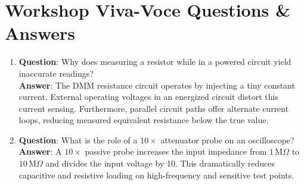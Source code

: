 \section{Workshop Viva-Voce Questions \& Answers}
\begin{enumerate}[leftmargin=1.5em]
    \item \textbf{Question}: Why does measuring a resistor while in a powered circuit yield inaccurate readings?\\
    \textbf{Answer}: The DMM resistance circuit operates by injecting a tiny constant current. External operating voltages in an energized circuit distort this current sensing. Furthermore, parallel circuit paths offer alternate current loops, reducing measured equivalent resistance below the true value.
    \item \textbf{Question}: What is the role of a $10\times$ attenuator probe on an oscilloscope?\\
    \textbf{Answer}: A $10\times$ passive probe increases the input impedance from $1\,\mathrm{M}\Omega$ to $10\,\mathrm{M}\Omega$ and divides the input voltage by 10. This dramatically reduces capacitive and resistive loading on high-frequency and sensitive test points.
\end{enumerate}
